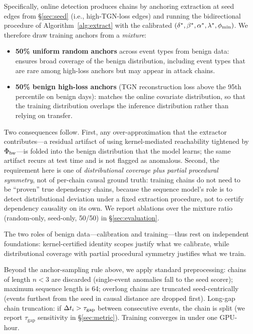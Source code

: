 Specifically, online detection produces chains by anchoring extraction at seed edges from \S\ref{sec:seed} (i.e., high-TGN-loss edges) and running the bidirectional procedure of Algorithm~\ref{alg:extract} with the calibrated $(\delta^*, \beta^*, \alpha^*, \lambda^*, \phi_{\min})$. We therefore draw training anchors from a \emph{mixture}:

\begin{itemize}
\item \textbf{50\% uniform random anchors} across event types from benign data: ensures broad coverage of the benign distribution, including event types that are rare among high-loss anchors but may appear in attack chains.
\item \textbf{50\% benign high-loss anchors} (TGN reconstruction loss above the 95th percentile on benign days): matches the online covariate distribution, so that the training distribution overlaps the inference distribution rather than relying on transfer.
\end{itemize}

Two consequences follow. First, any over-approximation that the extractor contributes---a residual artifact of using kernel-mediated reachability tightened by $\Phi_{\text{bw}}$---is folded into the benign distribution that the model learns; the same artifact recurs at test time and is not flagged as anomalous. Second, the requirement here is one of \emph{distributional coverage plus partial procedural symmetry}, not of per-chain causal ground truth: training chains do not need to be ``proven'' true dependency chains, because the sequence model's role is to detect distributional deviation under a fixed extraction procedure, not to certify dependency causality on its own. We report ablations over the mixture ratio (random-only, seed-only, 50/50) in \S\ref{sec:evaluation}.

The two roles of benign data---calibration and training---thus rest on independent foundations: kernel-certified identity scopes justify what we calibrate, while distributional coverage with partial procedural symmetry justifies what we train.

Beyond the anchor-sampling rule above, we apply standard preprocessing: chains of length $n < 3$ are discarded (single-event anomalies fall to the seed scorer); maximum sequence length is 64; overlong chains are truncated seed-centrically (events furthest from the seed in causal distance are dropped first). Long-gap chain truncation: if $\Delta t_i > \tau_{\text{gap}}$ between consecutive events, the chain is split (we report $\tau_{\text{gap}}$ sensitivity in \S\ref{sec:metric}). Training converges in under one GPU-hour.

